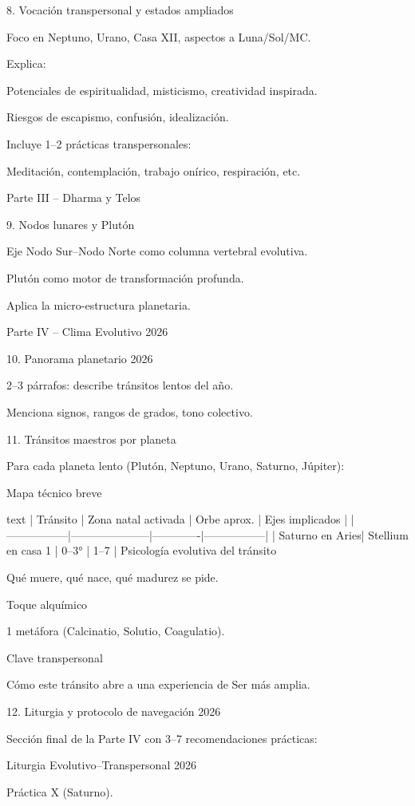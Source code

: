 8. Vocación transpersonal y estados ampliados

Foco en Neptuno, Urano, Casa XII, aspectos a Luna/Sol/MC.

Explica:

Potenciales de espiritualidad, misticismo, creatividad inspirada.

Riesgos de escapismo, confusión, idealización.

Incluye 1–2 prácticas transpersonales:

Meditación, contemplación, trabajo onírico, respiración, etc.

Parte III – Dharma y Telos

9. Nodos lunares y Plutón

Eje Nodo Sur–Nodo Norte como columna vertebral evolutiva.

Plutón como motor de transformación profunda.

Aplica la micro-estructura planetaria.

Parte IV – Clima Evolutivo 2026

10. Panorama planetario 2026

2–3 párrafos: describe tránsitos lentos del año.

Menciona signos, rangos de grados, tono colectivo.

11. Tránsitos maestros por planeta

Para cada planeta lento (Plutón, Neptuno, Urano, Saturno, Júpiter):

Mapa técnico breve

text
| Tránsito        | Zona natal activada | Orbe aprox. | Ejes implicados |
|-----------------|---------------------|-------------|-----------------|
| Saturno en Aries| Stellium en casa 1  | 0–3°        | 1–7             |
Psicología evolutiva del tránsito

Qué muere, qué nace, qué madurez se pide.

Toque alquímico

1 metáfora (Calcinatio, Solutio, Coagulatio).

Clave transpersonal

Cómo este tránsito abre a una experiencia de Ser más amplia.

12. Liturgia y protocolo de navegación 2026

Sección final de la Parte IV con 3–7 recomendaciones prácticas:

Liturgia Evolutivo–Transpersonal 2026

Práctica X (Saturno).

